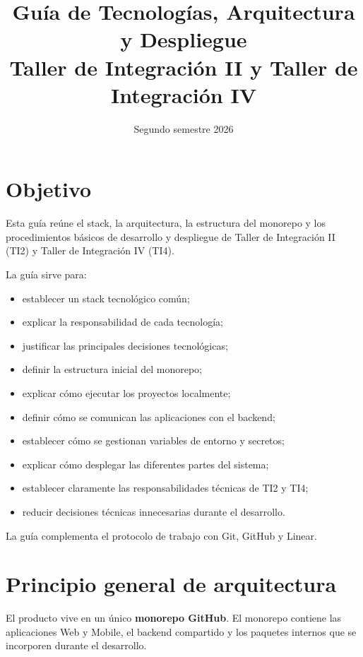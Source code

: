 \documentclass[11pt,a4paper]{article}
\title{
  \textbf{Guía de Tecnologías, Arquitectura y Despliegue}\\
  \large Taller de Integración II y Taller de Integración IV
}
\author{}
\date{Segundo semestre 2026}
\begin{document}
\maketitle

\section{Objetivo}

Esta guía reúne el stack, la arquitectura, la estructura del monorepo y los
procedimientos básicos de desarrollo y despliegue de Taller de Integración II
(TI2) y Taller de Integración IV (TI4).

La guía sirve para:

\begin{itemize}
  \item establecer un stack tecnológico común;
  \item explicar la responsabilidad de cada tecnología;
  \item justificar las principales decisiones tecnológicas;
  \item definir la estructura inicial del monorepo;
  \item explicar cómo ejecutar los proyectos localmente;
  \item definir cómo se comunican las aplicaciones con el backend;
  \item establecer cómo se gestionan variables de entorno y secretos;
  \item explicar cómo desplegar las diferentes partes del sistema;
  \item establecer claramente las responsabilidades técnicas de TI2 y TI4;
  \item reducir decisiones técnicas innecesarias durante el desarrollo.
\end{itemize}

La guía complementa el protocolo de trabajo con Git, GitHub y Linear.

\section{Principio general de arquitectura}

El producto vive en un único \textbf{monorepo GitHub}. El monorepo contiene las
aplicaciones Web y Mobile, el backend compartido y los paquetes internos que se
incorporen durante el desarrollo.
\end{document}
